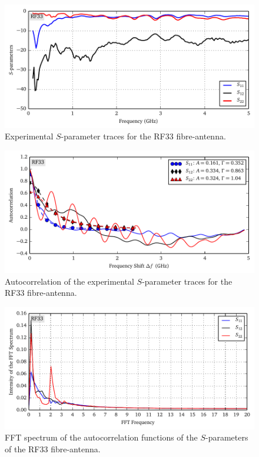 \begin{figure}
 \centering
 \includegraphics{figs/active/RF33-sParameters.pdf}
 \caption[Experimental $S$-parameter traces for the RF33 fibre-antenna]
 		{Experimental $S$-parameter traces for the RF33 fibre-antenna.}
 \label{fig:active.lcx.rf33sParameters}
\end{figure}

\begin{figure}
 \centering
 \includegraphics{figs/active/RF33-autoCorrelation.pdf}
 \caption[Autocorrelation of the experimental $S$-parameter traces for the RF33 fibre-antenna]
 		{Autocorrelation of the experimental $S$-parameter traces for the RF33 fibre-antenna.}
 \label{fig:active.lcx.rf33autocorrelation}
\end{figure}

\begin{figure}
 \centering
 \includegraphics{figs/active/RF33-fft.pdf}
 \caption[FFT spectrum of the autocorrelation functions of the $S$-parameters of the RF33 fibre-antenna]
 		{FFT spectrum of the autocorrelation functions of the $S$-parameters of the RF33 fibre-antenna.}
 \label{fig:active.lcx.rf33fft}
\end{figure}


